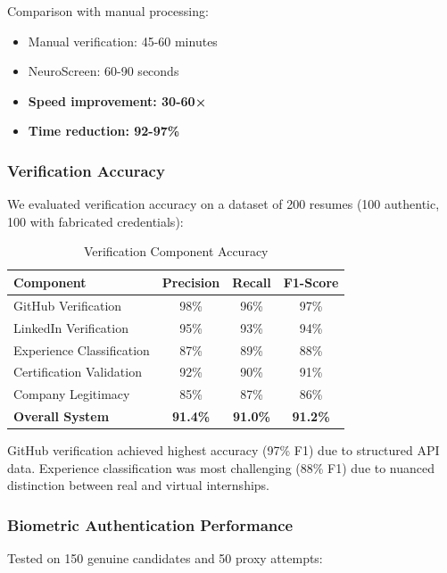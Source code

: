 \documentclass[conference]{IEEEtran}
\begin{document}
Comparison with manual processing:
\begin{itemize}
    \item Manual verification: 45-60 minutes
    \item NeuroScreen: 60-90 seconds
    \item \textbf{Speed improvement: 30-60×}
    \item \textbf{Time reduction: 92-97\%}
\end{itemize}

\subsubsection{Verification Accuracy}

We evaluated verification accuracy on a dataset of 200 resumes (100 authentic, 100 with fabricated credentials):

\begin{table}[h]
\centering
\caption{Verification Component Accuracy}
\label{tab:verification_accuracy}
\begin{tabular}{@{}lccc@{}}
\toprule
\textbf{Component} & \textbf{Precision} & \textbf{Recall} & \textbf{F1-Score} \\ \midrule
GitHub Verification & 98\% & 96\% & 97\% \\
LinkedIn Verification & 95\% & 93\% & 94\% \\
Experience Classification & 87\% & 89\% & 88\% \\
Certification Validation & 92\% & 90\% & 91\% \\
Company Legitimacy & 85\% & 87\% & 86\% \\ \midrule
\textbf{Overall System} & \textbf{91.4\%} & \textbf{91.0\%} & \textbf{91.2\%} \\ \bottomrule
\end{tabular}
\end{table}

GitHub verification achieved highest accuracy (97\% F1) due to structured API data. Experience classification was most challenging (88\% F1) due to nuanced distinction between real and virtual internships.

\subsubsection{Biometric Authentication Performance}

Tested on 150 genuine candidates and 50 proxy attempts:
\end{document}
